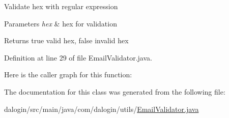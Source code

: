 Validate hex with regular expression


\begin{DoxyParams}{Parameters}
{\em hex} & hex for validation \\
\hline
\end{DoxyParams}
\begin{DoxyReturn}{Returns}
true valid hex, false invalid hex 
\end{DoxyReturn}


Definition at line 29 of file Email\+Validator.\+java.

Here is the caller graph for this function\+:


The documentation for this class was generated from the following file\+:\begin{DoxyCompactItemize}
\item 
dalogin/src/main/java/com/dalogin/utils/\hyperlink{_email_validator_8java}{Email\+Validator.\+java}\end{DoxyCompactItemize}
